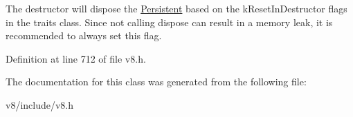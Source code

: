 The destructor will dispose the \mbox{\hyperlink{classv8_1_1Persistent}{Persistent}} based on the k\+Reset\+In\+Destructor flags in the traits class. Since not calling dispose can result in a memory leak, it is recommended to always set this flag. 

Definition at line 712 of file v8.\+h.



The documentation for this class was generated from the following file\+:\begin{DoxyCompactItemize}
\item 
v8/include/v8.\+h\end{DoxyCompactItemize}
